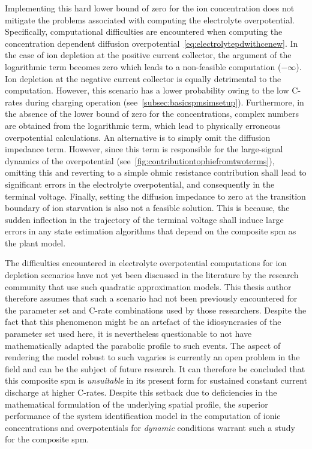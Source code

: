 Implementing  this  hard   lower  bound  of  zero  for   the  ion  concentration
does    not   mitigate    the   problems    associated   with    computing   the
electrolyte   overpotential.   Specifically,  computational   difficulties   are
encountered    when   computing    the    concentration   dependent    diffusion
overpotential~\cref{eq:electrolytepdwithcenew}. In the case  of ion depletion at
the positive  current collector,  the argument of  the logarithmic  term becomes
zero which leads to a non-feasible computation ($-\infty$). Ion depletion at the
negative current collector  is equally detrimental to  the computation. However,
this scenario has  a lower probability owing to the  low C-rates during charging
operation (see~\cref{subsec:basicspmsimsetup}).  Furthermore, in the  absence of
the lower  bound of zero  for the  concentrations, complex numbers  are obtained
from  the logarithmic  term, which  lead to  physically erroneous  overpotential
calculations. An  alternative is  to simply omit  the diffusion  impedance term.
However, since  this term is  responsible for  the large-signal dynamics  of the
overpotential (see~\cref{fig:contributiontophiefromtwoterms}), omitting this and
reverting to  a simple ohmic  resistance contribution shall lead  to significant
errors  in  the electrolyte  overpotential,  and  consequently in  the  terminal
voltage.  Finally, setting  the diffusion  impedance to  zero at  the transition
boundary of ion starvation is also not a feasible solution. This is because, the
sudden inflection in  the trajectory of the terminal voltage  shall induce large
errors in any state estimation algorithms that depend on the composite \gls{spm}
as the plant model.

The  difficulties  encountered  in electrolyte  overpotential  computations  for
ion  depletion scenarios  have  not  yet been  discussed  in  the literature  by
the  research  community that  use  such  quadratic approximation  models.  This
thesis author  therefore assumes that  such a  scenario had not  been previously
encountered  for  the  parameter  set  and C-rate  combinations  used  by  those
researchers. Despite the  fact that this phenomenon might be  an artefact of the
idiosyncrasies of the  parameter set used here, it  is nevertheless questionable
to not  have mathematically adapted  the parabolic  profile to such  events. The
aspect  of rendering  the model  robust to  such vagaries  is currently  an open
problem in the field and can be the subject of future research. It can therefore
be concluded that  this composite \gls{spm} is \emph{unsuitable}  in its present
form for  sustained constant current  discharge at higher C-rates.  Despite this
setback due  to deficiencies in  the mathematical formulation of  the underlying
spatial profile, the superior performance  of the system identification model in
the computation  of ionic  concentrations and overpotentials  for \emph{dynamic}
conditions warrant such a study for the composite \gls{spm}.

